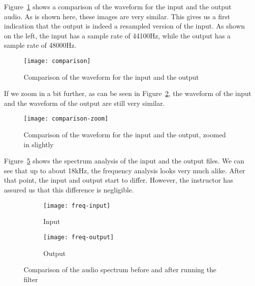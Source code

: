 
Figure~\ref{fig:simulation:waveform} shows a comparison of the waveform for the input and the output audio.
As is shown here, these images are very similar.
This gives us a first indication that the output is indeed a resampled version of the input.
As shown on the left, the input has a sample rate of 44100Hz, while the output has a sample rate of 48000Hz.

\begin{figure}[H]
	\centering
	\texttt{[image: comparison]}
	\caption{Comparison of the waveform for the input and the output}
	\label{fig:simulation:waveform}
\end{figure}

If we zoom in a bit further, as can be seen in Figure~\ref{fig:simulation:waveformzoom}, the waveform of the input and the waveform of the output are still very similar.

\begin{figure}[H]
	\centering
	\texttt{[image: comparison-zoom]}
	\caption{Comparison of the waveform for the input and the output, zoomed in slightly}
	\label{fig:simulation:waveformzoom}
\end{figure}

Figure~\ref{fig:simulation:spectrum} shows the spectrum analysis of the input and the output files.
We can see that up to about 18kHz, the frequency analysis looks very much alike.
After that point, the input and output start to differ.
However, the instructor has assured us that this difference is negligible.

\begin{figure}[H]
	\centering
	\begin{subfigure}[l]{0.7\textwidth}
		\texttt{[image: freq-input]}
		\caption{Input}
		\label{fig:simulation:spectrum:before}
	\end{subfigure}

	\begin{subfigure}[l]{0.7\textwidth}
		\texttt{[image: freq-output]}
		\caption{Output}
		\label{fig:simulation:spectrum:after}
	\end{subfigure}

	\caption{Comparison of the audio spectrum before and after running the filter}
	\label{fig:simulation:spectrum}
\end{figure}

